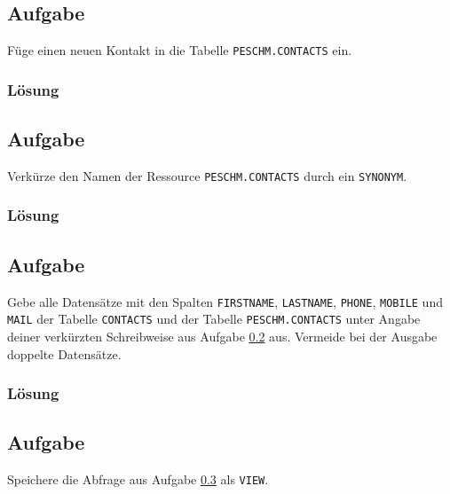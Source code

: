 \subsection{Aufgabe}
\label{sec:uebung_03.aufgabe_03}
Füge einen neuen Kontakt in die Tabelle \texttt{PESCHM.CONTACTS} ein.

\subsubsection*{Lösung}
\label{sec:uebung_03.aufgabe_03.loesung}

\subsection{Aufgabe}
\label{sec:uebung_03.aufgabe_04}
Verkürze den Namen der Ressource \texttt{PESCHM.CONTACTS} durch ein \texttt{SYNONYM}.

\subsubsection*{Lösung}
\label{sec:uebung_03.aufgabe_04.loesung}

\subsection{Aufgabe}
\label{sec:uebung_03.aufgabe_05}
Gebe alle Datensätze mit den Spalten \texttt{FIRSTNAME}, \texttt{LASTNAME}, \texttt{PHONE}, \texttt{MOBILE} und \texttt{MAIL} der Tabelle \texttt{CONTACTS} und der Tabelle \texttt{PESCHM.CONTACTS} unter Angabe deiner verkürzten Schreibweise aus Aufgabe \ref{sec:uebung_03.aufgabe_04} aus. Vermeide bei der Ausgabe doppelte Datensätze.

\subsubsection*{Lösung}
\label{sec:uebung_03.aufgabe_05.loesung}

\subsection{Aufgabe}
\label{sec:uebung_03.aufgabe_06}
Speichere die Abfrage aus Aufgabe \ref{sec:uebung_03.aufgabe_05} als \texttt{VIEW}.

